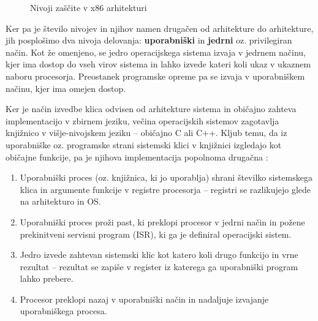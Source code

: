 \documentclass[a4paper,12pt,openright]{book}
\begin{document}
\begin{figure}[h!]
	\begin{center}
	\end{center}
	\caption{Nivoji zaščite v x86 arhitekturi \cite{Intel_2024}}
	\label{fig:privilege_levels_x86}
\end{figure}

Ker pa je število nivojev in njihov namen drugačen od arhitekture do arhitekture, jih posplošimo dva nivoja delovanja: \textbf{uporabniški} in \textbf{jedrni} oz. privilegiran način.
Kot že omenjeno, se jedro operacijskega sistema izvaja v jedrnem načinu, kjer ima dostop do vseh virov sistema in lahko izvede kateri koli ukaz v ukaznem naboru procesorja.
Preostanek programske opreme pa se izvaja v uporabniškem načinu, kjer ima omejen dostop.

Ker je način izvedbe klica odvisen od arhitekture sistema in običajno zahteva implementacijo v zbirnem jeziku, večina operacijskih sistemov zagotavlja knjižnico v višje-nivojskem jeziku -- običajno C ali C++.
Kljub temu, da iz uporabniške oz. programske strani sistemski klici v knjižnici izgledajo kot običajne funkcije, pa je njihova implementacija popolnoma drugačna \cite{Tanenbaum_Bos_2023}:
\begin{enumerate}
	\item Uporabniški proces (oz. knjižnica, ki jo uporablja) shrani številko sistemskega klica in argumente funkcije v registre procesorja -- registri se razlikujejo glede na arhitekturo in OS.
	\item Uporabniški proces proži past, ki preklopi procesor v jedrni način in požene prekinitveni servisni program (ISR), ki ga je definiral operacijski sistem.
	\item Jedro izvede zahtevan sistemski klic kot katero koli drugo funkcijo in vrne rezultat -- rezultat se zapiše v register iz katerega ga uporabniški program lahko prebere.
	\item Procesor preklopi nazaj v uporabniški način in nadaljuje izvajanje uporabniškega procesa.
\end{enumerate}
\end{document}
